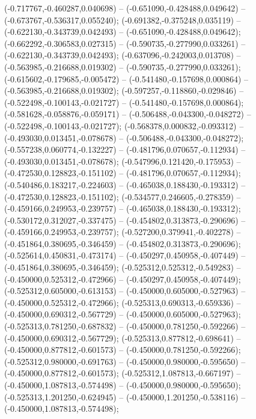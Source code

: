  (-0.717767,-0.460287,0.040698) -- (-0.651090,-0.428488,0.049642) -- (-0.673767,-0.536317,0.055240);
 (-0.691382,-0.375248,0.035119) -- (-0.622130,-0.343739,0.042493) -- (-0.651090,-0.428488,0.049642);
 (-0.662292,-0.306583,0.027315) -- (-0.590735,-0.277990,0.033261) -- (-0.622130,-0.343739,0.042493);
 (-0.637096,-0.242003,0.013708) -- (-0.563985,-0.216688,0.019302) -- (-0.590735,-0.277990,0.033261);
 (-0.615602,-0.179685,-0.005472) -- (-0.541480,-0.157698,0.000864) -- (-0.563985,-0.216688,0.019302);
 (-0.597257,-0.118860,-0.029846) -- (-0.522498,-0.100143,-0.021727) -- (-0.541480,-0.157698,0.000864);
 (-0.581628,-0.058876,-0.059171) -- (-0.506488,-0.043300,-0.048272) -- (-0.522498,-0.100143,-0.021727);
 (-0.568378,0.000832,-0.093312) -- (-0.493030,0.013451,-0.078678) -- (-0.506488,-0.043300,-0.048272);
 (-0.557238,0.060774,-0.132227) -- (-0.481796,0.070657,-0.112934) -- (-0.493030,0.013451,-0.078678);
 (-0.547996,0.121420,-0.175953) -- (-0.472530,0.128823,-0.151102) -- (-0.481796,0.070657,-0.112934);
 (-0.540486,0.183217,-0.224603) -- (-0.465038,0.188430,-0.193312) -- (-0.472530,0.128823,-0.151102);
 (-0.534577,0.246605,-0.278359) -- (-0.459166,0.249953,-0.239757) -- (-0.465038,0.188430,-0.193312);
 (-0.530172,0.312027,-0.337475) -- (-0.454802,0.313873,-0.290696) -- (-0.459166,0.249953,-0.239757);
 (-0.527200,0.379941,-0.402278) -- (-0.451864,0.380695,-0.346459) -- (-0.454802,0.313873,-0.290696);
 (-0.525614,0.450831,-0.473174) -- (-0.450297,0.450958,-0.407449) -- (-0.451864,0.380695,-0.346459);
 (-0.525312,0.525312,-0.549283) -- (-0.450000,0.525312,-0.472966) -- (-0.450297,0.450958,-0.407449);
 (-0.525312,0.605000,-0.613153) -- (-0.450000,0.605000,-0.527963) -- (-0.450000,0.525312,-0.472966);
 (-0.525313,0.690313,-0.659336) -- (-0.450000,0.690312,-0.567729) -- (-0.450000,0.605000,-0.527963);
 (-0.525313,0.781250,-0.687832) -- (-0.450000,0.781250,-0.592266) -- (-0.450000,0.690312,-0.567729);
 (-0.525313,0.877812,-0.698641) -- (-0.450000,0.877812,-0.601573) -- (-0.450000,0.781250,-0.592266);
 (-0.525312,0.980000,-0.691763) -- (-0.450000,0.980000,-0.595650) -- (-0.450000,0.877812,-0.601573);
 (-0.525312,1.087813,-0.667197) -- (-0.450000,1.087813,-0.574498) -- (-0.450000,0.980000,-0.595650);
 (-0.525313,1.201250,-0.624945) -- (-0.450000,1.201250,-0.538116) -- (-0.450000,1.087813,-0.574498);
